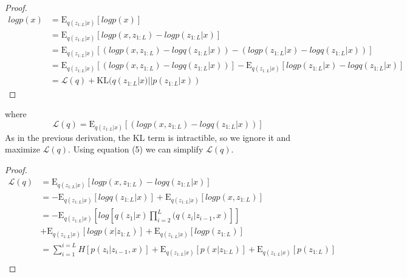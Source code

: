 \documentclass[10pt]{article}
\begin{document}
\begin{proof}
	\begin{align*}
	logp(x) &= \mathrm{E}_{q(z_{1:L}|x)}[logp(x)] \\
	&= \mathrm{E}_{q(z_{1:L}|x)}[logp(x,z_{1:L}) - logp(z_{1:L}|x)]\\
	&= \mathrm{E}_{q(z_{1:L}|x)}[(logp(x,z_{1:L}) - logq(z_{1:L}|x)) - (logp(z_{1:L}|x)- logq(z_{1:L}|x))]\\
	&= \mathrm{E}_{q(z_{1:L}|x)}[(logp(x,z_{1:L}) - logq(z_{1:L}|x))] - \mathrm{E}_{q(z_{1:L}|x)}[logp(z_{1:L}|x)- logq(z_{1:L}|x)]\\
	&= \mathcal{L}(q) + \mathrm{KL}(q(z_{1:L}|x)||p(z_{1:L}|x))
	\end{align*}
\end{proof}
where 
\begin{equation} \label{new_LB}
\mathcal{L}(q) = \mathrm{E}_{q(z_{1:L}|x)}[(logp(x,z_{1:L}) - logq(z_{1:L}|x))]
\end{equation}
As in the previous derivation, the KL term is intractible, so we ignore it and maximize $\mathcal{L}(q)$.  Using equation (5) we can simplify $\mathcal{L}(q)$.
\begin{proof}
	\begin{align*}
	\mathcal{L}(q) &= \mathrm{E}_{q(z_{1:L}|x)}[logp(x,z_{1:L}) - logq(z_{1:L}|x)] \\
	&= -\mathrm{E}_{q(z_{1:L}|x)}[logq(z_{1:L}|x)] + \mathrm{E}_{q(z_{1:L}|x)}[logp(x,z_{1:L})]\\
	&= -\mathrm{E}_{q(z_{1:L}|x)}[log[q(z_{1}|x) \prod_{i=2}^{L}(q(z_{i}|z_{i-1},x)]] \\ &+ \mathrm{E}_{q(z_{1:L}|x)}[logp(x|z_{1:L})] + \mathrm{E}_{q(z_{1:L}|x)}[logp(z_{1:L})]\\
	&= \sum_{i=1}^{i=L}H[p(z_{i}|z_{i-1},x)] + \mathrm{E}_{q(z_{1:L}|x)}[p(x|z_{1:L})] + \mathrm{E}_{q(z_{1:L}|x)}[p(z_{1:L})]\\
	\end{align*}
\end{proof}
\end{document}
